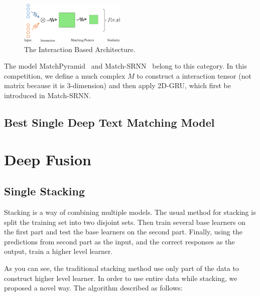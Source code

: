 \documentclass[12pt]{article}
\begin{document}
\begin{figure}[ht]
  \centering
  \includegraphics[width=0.45\textwidth]{../img/match_ptn}
  \caption{The Interaction Based Architecture.} \label{Fig.interaction}
\end{figure}

The model MatchPyramid~\cite{} and Match-SRNN~\cite{} belong to this category. In this competition, we define a much complex $M$ to construct a interaction tensor (not matrix because it is 3-dimension) and then apply 2D-GRU, which first be introduced in Match-SRNN.

\subsection{Best Single Deep Text Matching Model}

\section{Deep Fusion}

\subsection{Single Stacking}
\label{chap:single-stacking}

Stacking is a way of combining multiple models. The usual method for stacking is split the training set into two disjoint sets. Then train several base learners on the first part and test the base learners on the second part. Finally, using the predictions from second part as the input, and the correct responses as the output, train a higher level learner.

As you can see, the traditional stacking method use only part of the data to construct higher level learner. In order to use entire data while stacking, we proposed a novel way. The algorithm described as follows:
\end{document}
